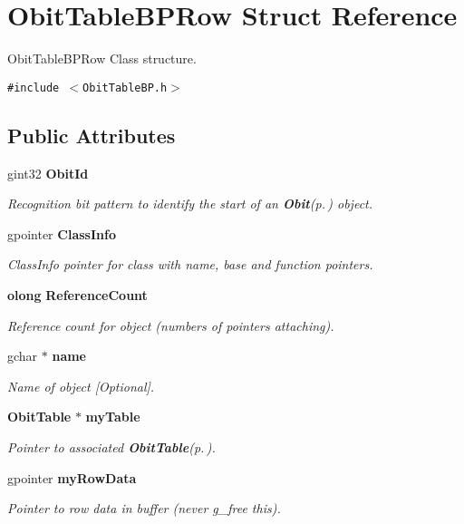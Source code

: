 \section{Obit\-Table\-BPRow Struct Reference}
\label{structObitTableBPRow}
Obit\-Table\-BPRow Class structure.  


{\tt \#include $<$Obit\-Table\-BP.h$>$}

\subsection*{Public Attributes}
\begin{CompactItemize}
\item 
gint32 {\bf Obit\-Id}
\begin{CompactList}\small\item\em Recognition bit pattern to identify the start of an {\bf Obit}{\rm (p.\,\pageref{structObit})} object. \item\end{CompactList}\item 
gpointer {\bf Class\-Info}
\begin{CompactList}\small\item\em Class\-Info pointer for class with name, base and function pointers. \item\end{CompactList}\item 
{\bf olong} {\bf Reference\-Count}
\begin{CompactList}\small\item\em Reference count for object (numbers of pointers attaching). \item\end{CompactList}\item 
gchar $\ast$ {\bf name}
\begin{CompactList}\small\item\em Name of object [Optional]. \item\end{CompactList}\item 
{\bf Obit\-Table} $\ast$ {\bf my\-Table}
\begin{CompactList}\small\item\em Pointer to associated {\bf Obit\-Table}{\rm (p.\,\pageref{structObitTable})}. \item\end{CompactList}\item 
gpointer {\bf my\-Row\-Data}
\begin{CompactList}\small\item\em Pointer to row data in buffer (never g\_\-free this). \item\end{CompactList}\item 

\end{CompactItemize}

